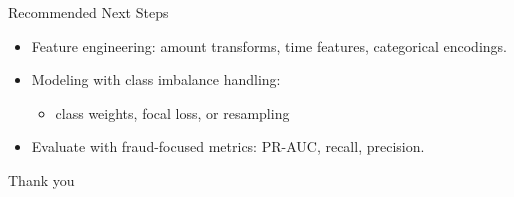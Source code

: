 \documentclass[aspectratio=169]{beamer}
\begin{document}
\begin{frame}{Recommended Next Steps}
\begin{itemize}
    \item Feature engineering: amount transforms, time features, categorical encodings.
    \item Modeling with class imbalance handling:
    \begin{itemize}
        \item class weights, focal loss, or resampling
    \end{itemize}
    \item Evaluate with fraud-focused metrics: PR-AUC, recall, precision.
\end{itemize}
\end{frame}

\begin{frame}
    \centering
    \Huge Thank you
\end{frame}
\end{document}
